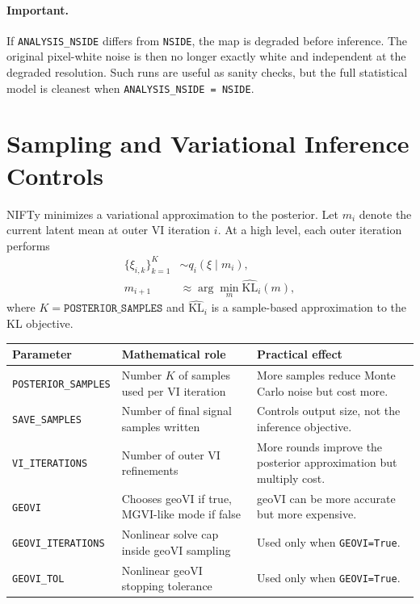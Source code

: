 \documentclass[11pt]{article}
\begin{document}
\paragraph{Important.}
If \texttt{ANALYSIS\_NSIDE} differs from \texttt{NSIDE}, the map is degraded
before inference.  The original pixel-white noise is then no longer exactly
white and independent at the degraded resolution.  Such runs are useful as
sanity checks, but the full statistical model is cleanest when
\texttt{ANALYSIS\_NSIDE = NSIDE}.

\section{Sampling and Variational Inference Controls}

NIFTy minimizes a variational approximation to the posterior.  Let $m_i$ denote
the current latent mean at outer VI iteration $i$.  At a high level, each
outer iteration performs
\begin{align}
    \{\xi_{i,k}\}_{k=1}^{K}
    &\sim q_i(\xi\mid m_i),
    \\
    m_{i+1}
    &\approx
    \arg\min_m
    \widehat{\mathrm{KL}}_i(m),
\end{align}
where $K=\texttt{POSTERIOR\_SAMPLES}$ and
$\widehat{\mathrm{KL}}_i$ is a sample-based approximation to the KL objective.

\begin{center}
\small
\begin{tabularx}{\textwidth}{lXX}
\toprule
Parameter & Mathematical role & Practical effect \\
\midrule
\texttt{POSTERIOR\_SAMPLES}
& Number $K$ of samples used per VI iteration
& More samples reduce Monte Carlo noise but cost more. \\
\texttt{SAVE\_SAMPLES}
& Number of final signal samples written
& Controls output size, not the inference objective. \\
\texttt{VI\_ITERATIONS}
& Number of outer VI refinements
& More rounds improve the posterior approximation but multiply cost. \\
\texttt{GEOVI}
& Chooses geoVI if true, MGVI-like mode if false
& geoVI can be more accurate but more expensive. \\
\texttt{GEOVI\_ITERATIONS}
& Nonlinear solve cap inside geoVI sampling
& Used only when \texttt{GEOVI=True}. \\
\texttt{GEOVI\_TOL}
& Nonlinear geoVI stopping tolerance
& Used only when \texttt{GEOVI=True}. \\
\bottomrule
\end{tabularx}
\end{center}
\end{document}
